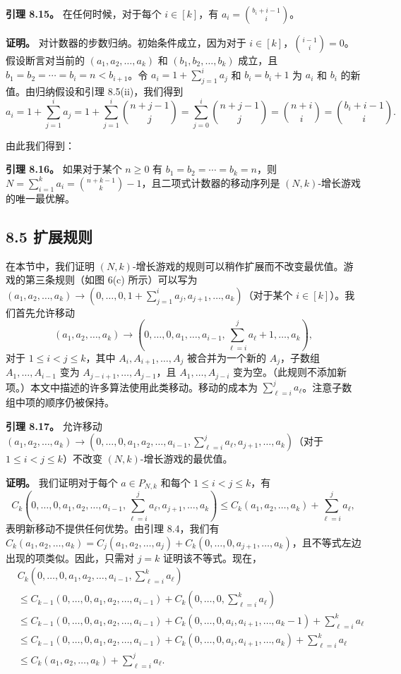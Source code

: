 \documentclass[12pt,a4paper]{ctexart}
\theoremstyle{remark}
\begin{document}
\textbf{引理 8.15。} 在任何时候，对于每个 $i\in[k]$，有 $a_i=\binom{b_i+i-1}{i}$。

\textbf{证明。} 对计数器的步数归纳。初始条件成立，因为对于 $i\in[k]$，$\binom{i-1}{i}=0$。假设断言对当前的 $(a_1,a_2,\ldots,a_k)$ 和 $(b_1,b_2,\ldots,b_k)$ 成立，且 $b_1=b_2=\cdots=b_i=n<b_{i+1}$。令 $a_i=1+\sum_{j=1}^{i}a_j$ 和 $b_i=b_i+1$ 为 $a_i$ 和 $b_i$ 的新值。由归纳假设和引理 8.5(ii)，我们得到
$$a_i = 1+\sum_{j=1}^{i}a_j = 1+\sum_{j=1}^{i}\binom{n+j-1}{j} = \sum_{j=0}^{i}\binom{n+j-1}{j} = \binom{n+i}{i} = \binom{b_i+i-1}{i}.$$

由此我们得到：

\textbf{引理 8.16。} 如果对于某个 $n\geq 0$ 有 $b_1=b_2=\cdots=b_k=n$，则 $N=\sum_{i=1}^{k}a_i=\binom{n+k-1}{k}-1$，且二项式计数器的移动序列是 $(N,k)$-增长游戏的唯一最优解。

\subsection{8.5 扩展规则}

在本节中，我们证明 $(N,k)$-增长游戏的规则可以稍作扩展而不改变最优值。游戏的第三条规则（如图 6(c) 所示）可以写为 $(a_1,a_2,\ldots,a_k)\rightarrow(0,\ldots,0,1+\sum_{j=1}^{i}a_j,a_{j+1},\ldots,a_k)$（对于某个 $i\in[k]$）。我们首先允许移动
$$(a_1,a_2,\ldots,a_k)\rightarrow(0,\ldots,0,a_1,\ldots,a_{i-1},\sum_{\ell=i}^{j}a_\ell+1,\ldots,a_k),$$
对于 $1\leq i<j\leq k$，其中 $A_i,A_{i+1},\ldots,A_j$ 被合并为一个新的 $A_j$，子数组 $A_1,\ldots,A_{i-1}$ 变为 $A_{j-i+1},\ldots,A_{j-1}$，且 $A_1,\ldots,A_{j-i}$ 变为空。（此规则不添加新项。）本文中描述的许多算法使用此类移动。移动的成本为 $\sum_{\ell=i}^{j}a_\ell$。注意子数组中项的顺序仍被保持。

\textbf{引理 8.17。} 允许移动 $(a_1,a_2,\ldots,a_k)\rightarrow(0,\ldots,0,a_1,a_2,\ldots,a_{i-1},\sum_{\ell=i}^{j}a_\ell,a_{j+1},\ldots,a_k)$（对于 $1\leq i<j\leq k$）不改变 $(N,k)$-增长游戏的最优值。

\textbf{证明。} 我们证明对于每个 $a\in P_{N,k}$ 和每个 $1\leq i<j\leq k$，有
$$C_k(0,\ldots,0,a_1,a_2,\ldots,a_{i-1},\sum_{\ell=i}^{j}a_\ell,a_{j+1},\ldots,a_k) \leq C_k(a_1,a_2,\ldots,a_k)+\sum_{\ell=i}^{j}a_\ell,$$
表明新移动不提供任何优势。由引理 8.4，我们有 $C_k(a_1,a_2,\ldots,a_k)=C_j(a_1,a_2,\ldots,a_j)+C_k(0,\ldots,0,a_{j+1},\ldots,a_k)$，且不等式左边出现的项类似。因此，只需对 $j=k$ 证明该不等式。现在，
\begin{align*}
&C_k(0,\ldots,0,a_1,a_2,\ldots,a_{i-1},\sum_{\ell=i}^{k}a_\ell) \\
&\leq C_{k-1}(0,\ldots,0,a_1,a_2,\ldots,a_{i-1}) + C_k(0,\ldots,0,\sum_{\ell=i}^{k}a_\ell) \\
&\leq C_{k-1}(0,\ldots,0,a_1,a_2,\ldots,a_{i-1}) + C_k(0,\ldots,0,a_i,a_{i+1},\ldots,a_k-1) + \sum_{\ell=i}^{k}a_\ell \\
&\leq C_{k-1}(0,\ldots,0,a_1,a_2,\ldots,a_{i-1}) + C_k(0,\ldots,0,a_i,a_{i+1},\ldots,a_k) + \sum_{\ell=i}^{k}a_\ell \\
&\leq C_k(a_1,a_2,\ldots,a_k) + \sum_{\ell=i}^{j}a_\ell.
\end{align*}
\end{document}
